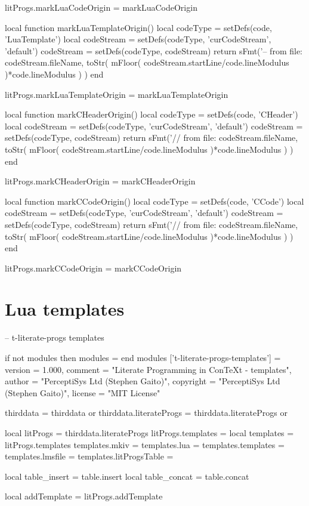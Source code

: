 litProgs.markLuaCodeOrigin = markLuaCodeOrigin

local function markLuaTemplateOrigin()
  local codeType       = setDefs(code, 'LuaTemplate')
  local codeStream     = setDefs(codeType, 'curCodeStream', 'default')
  codeStream           = setDefs(codeType, codeStream)
  return sFmt('-- from file: %
    codeStream.fileName,
    toStr(
      mFloor(
        codeStream.startLine/code.lineModulus
      )*code.lineModulus
    )
  )
end

litProgs.markLuaTemplateOrigin = markLuaTemplateOrigin

local function markCHeaderOrigin()
  local codeType       = setDefs(code, 'CHeader')
  local codeStream     = setDefs(codeType, 'curCodeStream', 'default')
  codeStream           = setDefs(codeType, codeStream)
  return sFmt('// from file: %
    codeStream.fileName,
    toStr(
      mFloor(
        codeStream.startLine/code.lineModulus
      )*code.lineModulus
    )
  )
end

litProgs.markCHeaderOrigin = markCHeaderOrigin

local function markCCodeOrigin()
  local codeType       = setDefs(code, 'CCode')
  local codeStream     = setDefs(codeType, 'curCodeStream', 'default')
  codeStream           = setDefs(codeType, codeStream)
  return sFmt('// from file: %
    codeStream.fileName,
    toStr(
      mFloor(
        codeStream.startLine/code.lineModulus
      )*code.lineModulus
    )
  )
end

litProgs.markCCodeOrigin = markCCodeOrigin
\stopLuaCode

\setLitProgsOriginMarker[MkIVCode][markMkIVCodeOrigin]
\setLitProgsOriginMarker[MpIVCode][markMpIVCodeOrigin]
\setLitProgsOriginMarker[LuaCode][markLuaCodeOrigin]
\setLitProgsOriginMarker[LuaTemplate][markLuaTemplateOrigin]

\section{Lua templates}

\startLuaTemplate
-- t-literate-progs templates

if not modules then modules = { } end
modules ['t-literate-progs-templates'] = {
    version   = 1.000,
    comment   = "Literate Programming in ConTeXt - templates",
    author    = "PerceptiSys Ltd (Stephen Gaito)",
    copyright = "PerceptiSys Ltd (Stephen Gaito)",
    license   = "MIT License"
}

thirddata               = thirddata               or {}
thirddata.literateProgs = thirddata.literateProgs or {}

local litProgs          = thirddata.literateProgs
litProgs.templates      = {}
local templates         = litProgs.templates
templates.mkiv          = {}
templates.lua           = {}
templates.templates     = {}
templates.lmsfile       = {}
templates.litProgsTable = {}

local table_insert = table.insert
local table_concat = table.concat

local addTemplate = litProgs.addTemplate
\stopLuaTemplate


\stopchapter